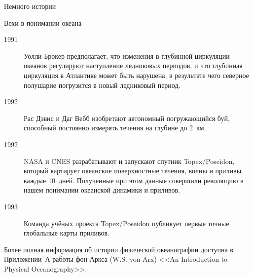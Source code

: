 \begin{chapter}{Немного истории}
\begin{section}{Вехи в понимании океана}
\begin{description}
\item[1991] Уолли Брокер предполагает, что изменения в глубинной
циркуляции океанов регулируют наступление ледниковых периодов, и что
глубинная циркуляция в Атлантике может быть нарушена, в результате чего
северное полушарие погрузится в новый ледниковый период.
%

\item[1992] Рас Дэвис и Даг Вебб изобретают автономный погружающийся
буй, способный постоянно измерять течения на глубине до 2~км.
%

\item[1992] NASA и CNES разрабатывают и запускают спутник Topex/Poseidon,
который картирует океанские поверхностные течения, волны и приливы каждые 
10~дней. Полученные при этом данные совершили революцию в нашем понимании
океанской динамики и приливов.
%

\item[1993] Команда учёных проекта Topex/Poseidon публикует первые точные
глобальные карты приливов.
%
\end{description}

Более полная информация об истории физической океанографии доступна
в Приложении~А работы фон Аркса (W.S. von Arx) <<An Introduction
to Physical Oceanography>>.
%


\end{section}
\end{chapter}
